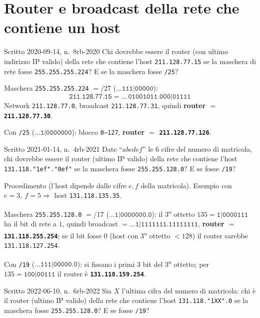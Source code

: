 \documentclass{report}
\begin{document}
\section{Router e broadcast della rete che contiene un host}

\begin{Exercise}{Scritto 2020-09-14, n.\ 8}{rb-2020}
Chi dovrebbe essere il router (con ultimo indirizzo IP valido) della rete che
contiene l'host \texttt{211.128.77.15} se la maschera di rete fosse
\texttt{255.255.255.224}? E se la maschera fosse \texttt{/25}?
\end{Exercise}

\begin{solution}
Maschera \texttt{255.255.255.224} $=/27$ ($\dots\texttt{111|00000}$):
\[
\texttt{211.128.77.15} = \dots\,\texttt{01001011.000|01111}
\]
Network \texttt{211.128.77.0}, broadcast \texttt{211.128.77.31}, quindi
\textbf{router $=$ \texttt{211.128.77.30}}.

\medskip
Con \texttt{/25} ($\dots\texttt{1|0000000}$): blocco \texttt{0--127},
\textbf{router $=$ \texttt{211.128.77.126}}.
\end{solution}

\begin{Exercise}{Scritto 2021-01-14, n.\ 4}{rb-2021}
Date ``$abcdef$'' le 6 cifre del numero di matricola, chi dovrebbe essere il
router (ultimo IP valido) della rete che contiene l'host
\texttt{131.118."1ef"."0ef"} se la maschera fosse \texttt{255.255.128.0}? E se
fosse \texttt{/19}?
\end{Exercise}

\begin{solution}
Procedimento (l'host dipende dalle cifre $e,f$ della matricola). Esempio con
$e=3,\ f=5 \Rightarrow$ host \texttt{131.118.135.35}.

Maschera \texttt{255.255.128.0} $=/17$ ($\dots\texttt{1|0000000.0}$): il
3\textsuperscript{o} ottetto $135=\texttt{1|0000111}$ ha il bit di rete a $1$,
quindi broadcast $=\dots\texttt{1|1111111.11111111}$, \textbf{router
$=$ \texttt{131.118.255.254}}; se il bit fosse $0$ (host con 3\textsuperscript{o}
ottetto $<128$) il router sarebbe \texttt{131.118.127.254}.

\medskip
Con \texttt{/19} ($\dots\texttt{111|00000.0}$): si fissano i primi 3 bit del
3\textsuperscript{o} ottetto; per $135=\texttt{100|00111}$ il router è
\textbf{\texttt{131.118.159.254}}.
\end{solution}

\begin{Exercise}{Scritto 2022-06-10, n.\ 6}{rb-2022}
Sia $X$ l'ultima cifra del numero di matricola: chi è il router (ultimo IP
valido) della rete che contiene l'host \texttt{131.118."1XX".0} se la maschera
fosse \texttt{255.255.128.0}? E se fosse \texttt{/19}?
\end{Exercise}
\end{document}
